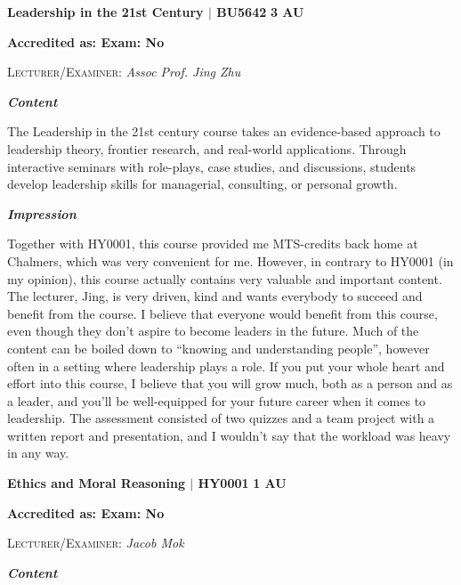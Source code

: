 \newpage

{\large{\textbf{Leadership in the 21st Century $\vert$ BU5642} \hfill \textbf{3 AU}}}
\vspace{-0.3cm}

\textbf{Accredited as: \hfill Exam: No}

{\large{\textsc{Lecturer/Examiner:} \textit{Assoc Prof. Jing Zhu}}} \vspace{0.4cm}

{\large{\textbf{\textit{Content}}}} 
\vspace{-0.25cm}

The Leadership in the 21st century course takes an evidence-based approach to leadership theory, frontier research, and real-world applications. Through interactive seminars with role-plays, case studies, and discussions, students develop leadership skills for managerial, consulting, or personal growth.

{\large{\textbf{\textit{Impression}}}}
\vspace{-0.25cm}

Together with HY0001, this course provided me MTS-credits back home at Chalmers, which was very convenient for me. However, in contrary to HY0001 (in my opinion), this course actually contains very valuable and important content. The lecturer, Jing, is very driven, kind and wants everybody to succeed and benefit from the course. I believe that everyone would benefit from this course, even though they don't aspire to become leaders in the future. Much of the content can be boiled down to ``knowing and understanding people'', however often in a setting where leadership plays a role. If you put your whole heart and effort into this course, I believe that you will grow much, both as a person and as a leader, and you'll be well-equipped for your future career when it comes to leadership. The assessment consisted of two quizzes and a team project with a written report and presentation, and I wouldn't say that the workload was heavy in any way.

\hrulefill

{\large{\textbf{Ethics and Moral Reasoning $\vert$ HY0001} \hfill \textbf{1 AU}}}
\vspace{-0.3cm}

\textbf{Accredited as: \hfill Exam: No}

{\large{\textsc{Lecturer/Examiner:} \textit{Jacob Mok}}} \vspace{0.4cm}

{\large{\textbf{\textit{Content}}}} 
\vspace{-0.25cm}

